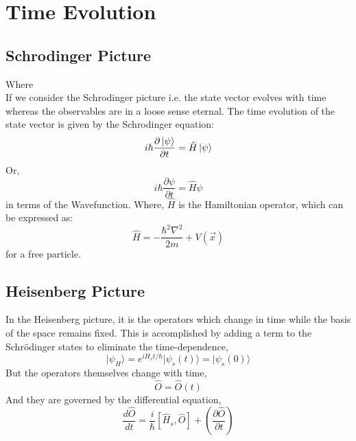 \section{Time Evolution}
\subsection{Schrodinger Picture}
Where\\
If we consider the Schrodinger picture i.e. the state vector evolves with time whereas the observables are in a loose sense eternal. The time evolution of the state vector is given by the Schrodinger equation:
\begin{equation}
	i \hbar \frac{\partial \ket{\psi}}{\partial t} = \hat{H} \ket{\psi}
\end{equation}
Or,
\begin{equation}
	i \hbar \frac{\partial \psi}{\partial t} = \hat{H} \psi
\end{equation}
in terms of the Wavefunction. Where, $\hat{H}$ is the Hamiltonian operator, which can be expressed as:
\begin{equation}
	\hat{H} = -\frac{\hbar^{2} \nabla^2}{2m} + V(\vec{x})
\end{equation}
for a free particle. 

\subsection{Heisenberg Picture}
In the Heisenberg picture, it is the operators which change in time while
the basis of the space remains fixed.
This is accomplished by adding a term to the Schrödinger states to eliminate the time-dependence,
\begin{equation}
    \vert \psi_H\rangle=e^{iH_st/\hbar}\vert\psi_s(t)\rangle=\vert\psi_s(0)\rangle
\end{equation}
But the operators themselves change with time,
\begin{equation}
    \hat{O}=\hat{O}(t)
\end{equation}
And they are governed by the differential equation,
\begin{equation}
    \frac{d\hat{O}}{dt}=\frac{i}{\hbar}[\hat{H}_s,\hat{O}]+ \left(\frac{\partial\hat{O}}{\partial t}\right)
\end{equation}
